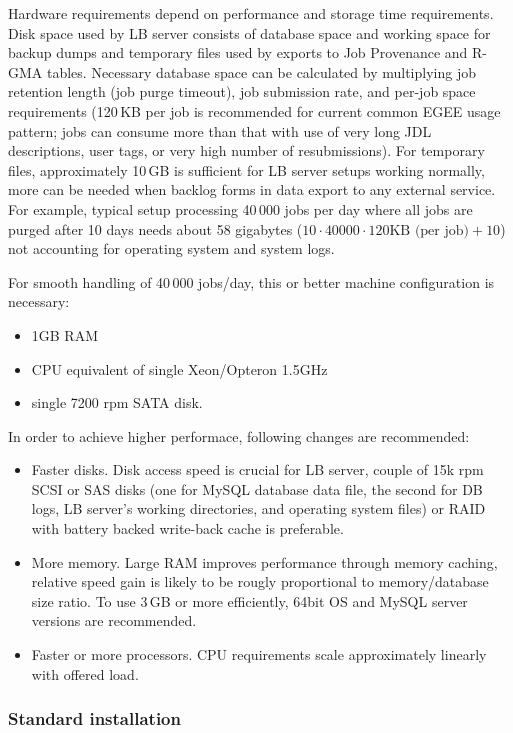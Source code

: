 Hardware requirements depend on performance and storage time requirements.
Disk space used by LB server consists of database space and working space 
for backup dumps and temporary files used by exports to Job Provenance and
R-GMA tables. Necessary database space can be calculated by multiplying 
job retention length (job purge timeout), job submission rate, and  
per-job space requirements (120\,KB per job is recommended for current common 
EGEE usage pattern; jobs can consume more than that with use of very long
JDL descriptions, user tags, or very high number of resubmissions).
For temporary files, approximately 10\,GB is sufficient for LB server setups
working normally, more can be needed when backlog forms in data export
to any external service. For example, typical setup processing 40\,000 jobs per 
day where all jobs are purged after 10 days needs about 58 gigabytes
($10 \cdot 40000 \cdot 120 \mbox{KB (per job)} + 10$) not accounting for operating 
system and system logs.

For smooth handling of 40\,000 jobs/day, this or better machine configuration 
is necessary:
\begin{itemize}
\item 1GB RAM
\item CPU equivalent of single Xeon/Opteron 1.5GHz
\item single 7200 rpm SATA disk.
\end{itemize}
In order to achieve higher performace, following changes are recommended:
\begin{itemize}
\item Faster disks. Disk access speed is crucial for LB server, couple of 15k rpm
SCSI or SAS disks (one for MySQL database data file, the second for DB logs, LB server's
working directories, and operating system files) or RAID with battery backed 
write-back cache is preferable.
\item More memory. Large RAM improves performance through memory caching,
relative speed gain is likely to be rougly proportional to memory/database size ratio.
To use 3\,GB or more efficiently, 64bit OS and MySQL server versions are recommended.
\item Faster or more processors. CPU requirements scale approximately linearly with
offered load.
\end{itemize}

\subsubsection{Standard installation}

